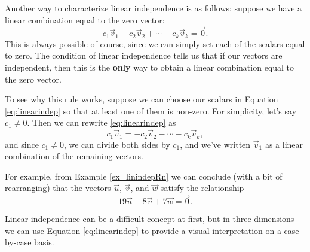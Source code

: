 \medskip

Another way to characterize linear independence is as follows: suppose we have a linear combination equal to the zero vector:
\begin{equation}\label{eq:linearindep}
c_1\vec{v}_1+c_2\vec{v}_2+\cdots +c_k\vec{v}_k = \vec{0}.
\end{equation}
This is always possible of course, since we can simply set each of the scalars equal to zero. The condition of linear independence tells us that if our vectors are independent, then this is the \textbf{only} way to obtain a linear combination equal to the zero vector. 

To see why this rule works, suppose we can choose our scalars in Equation \eqref{eq:linearindep} so that at least one of them is non-zero. For simplicity, let's say $c_1\neq 0$. Then we can rewrite \eqref{eq:linearindep} as
\[
c_1\vec{v}_1 = -c_2\vec{v}_2-\cdots - c_k\vec{v}_k,
\]
and since $c_1\neq 0$, we can divide both sides by $c_1$, and we've written $\vec{v}_1$ as a linear combination of the remaining vectors.

For example, from Example \ref{ex_linindepRn} we can conclude (with a bit of rearranging) that the vectors $\vec{u}$, $\vec{v}$, and $\vec{w}$ satisfy the relationship
\[
19\vec{u}-8\vec{v}+7\vec{w} = \vec{0}.
\]



Linear independence can be a difficult concept at first, but in three dimensions we can use Equation \eqref{eq:linearindep} to provide a visual interpretation on a case-by-case basis. 

\smallskip


